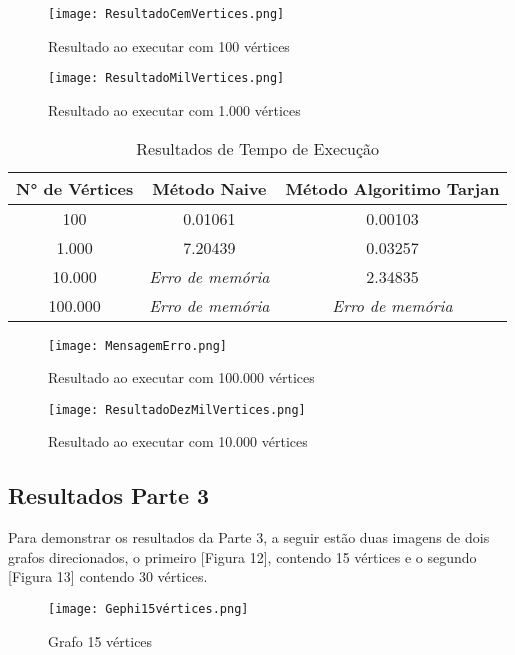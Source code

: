 \documentclass[12pt]{article}
\begin{document}
\begin{figure}[ht]
\centering
\texttt{[image: ResultadoCemVertices.png]}
\caption{Resultado ao executar com 100 vértices}
\label{fig:exampleFig1}
\end{figure}

\begin{figure}[ht]
\centering
\texttt{[image: ResultadoMilVertices.png]}
\caption{Resultado ao executar com 1.000 vértices}
\label{fig:exampleFig1}
\end{figure}

\begin{table}[ht]
\centering
\caption{Resultados de Tempo de Execução}
\label{tab:resultados}
\begin{tabular}{|c|c|c|}
\hline
\textbf{N° de Vértices} & \textbf{Método Naive} & \textbf{Método Algoritimo Tarjan} \\ \hline
100 & 0.01061 & 0.00103 \\ \hline
1.000 & 7.20439 & 0.03257 \\ \hline
10.000 & \textit{Erro de memória} & 2.34835 \\ \hline
100.000 & \textit{Erro de memória} & \textit{Erro de memória} \\ \hline
\end{tabular}
\end{table}

\begin{figure}[ht]
\centering
\texttt{[image: MensagemErro.png]}
\caption{Resultado ao executar com 100.000 vértices}
\label{fig:exampleFig1}
\end{figure}

\begin{figure}[ht]
\centering
\texttt{[image: ResultadoDezMilVertices.png]}
\caption{Resultado ao executar com 10.000 vértices}
\label{fig:exampleFig1}
\end{figure}

\clearpage

\subsection{Resultados Parte 3}

Para demonstrar os resultados da Parte 3, a seguir estão duas imagens de dois grafos direcionados, o primeiro [Figura 12], contendo 15 vértices e o segundo [Figura 13] contendo 30 vértices.

\begin{figure}[ht]
\centering
\texttt{[image: Gephi15vértices.png]}
\caption{Grafo 15 vértices}
\label{fig:exampleFig1}
\end{figure}
\end{document}
